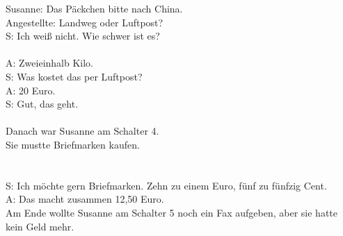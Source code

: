 \noindent
Susanne: Das Päckchen bitte nach China. \\
Angestellte: Landweg oder Luftpost? \\
S: Ich weiß nicht. Wie schwer ist es?  \\
\\
\noindent
A: Zweieinhalb Kilo.  \\
S: Was kostet das per Luftpost? \\
A: 20 Euro. \\
S: Gut, das geht. \\
\\
\noindent
Danach war Susanne am Schalter 4.  \\
Sie mustte Briefmarken kaufen.  \\
\\
\\
\noindent
S: Ich möchte gern Briefmarken.  Zehn zu einem Euro, fünf zu fünfzig Cent. \\
A: Das macht zusammen 12,50 Euro.
\\
\noindent
Am Ende wollte Susanne am Schalter 5 noch ein Fax aufgeben, aber sie hatte kein Geld mehr. \\

